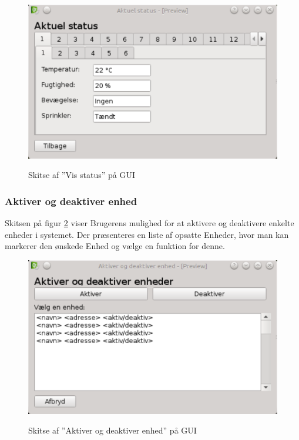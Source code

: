 \begin{figure}[htbp] \centering
{\includegraphics[scale=0.5]{filer/pics/GUI/Aktuel-status}}
\caption{Skitse af ''Vis status'' på GUI}
\label{fig:GUI-aktuel-status}
\end{figure}

\subsubsection{Aktiver og deaktiver enhed}
Skitsen på figur \ref{fig:GUI-aktiver-deaktiver} viser Brugerens mulighed for at aktivere og deaktivere enkelte enheder i systemet. Der præsenteres en liste af opsatte Enheder, hvor man kan markerer den ønskede Enhed og vælge en funktion for denne.

\begin{figure}[htbp] \centering
{\includegraphics[scale=0.5]{filer/pics/GUI/Aktiver-deaktiver-enheder}}
\caption{Skitse af ''Aktiver og deaktiver enhed'' på GUI}
\label{fig:GUI-aktiver-deaktiver}
\end{figure}

